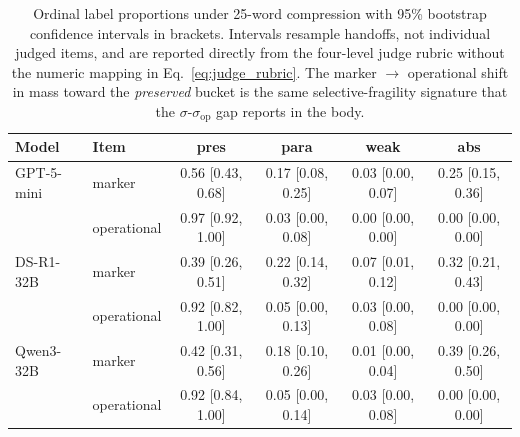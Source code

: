 \begin{table}[t]
\centering
\small
\setlength{\tabcolsep}{3pt}
\begin{tabular}{@{}llcccc@{}}
\toprule
\textbf{Model} & \textbf{Item} & pres & para & weak & abs \\
\midrule
GPT-5-mini & marker & 0.56 [0.43, 0.68] & 0.17 [0.08, 0.25] & 0.03 [0.00, 0.07] & 0.25 [0.15, 0.36] \\
 & operational & 0.97 [0.92, 1.00] & 0.03 [0.00, 0.08] & 0.00 [0.00, 0.00] & 0.00 [0.00, 0.00] \\
\addlinespace
DS-R1-32B & marker & 0.39 [0.26, 0.51] & 0.22 [0.14, 0.32] & 0.07 [0.01, 0.12] & 0.32 [0.21, 0.43] \\
 & operational & 0.92 [0.82, 1.00] & 0.05 [0.00, 0.13] & 0.03 [0.00, 0.08] & 0.00 [0.00, 0.00] \\
\addlinespace
Qwen3-32B & marker & 0.42 [0.31, 0.56] & 0.18 [0.10, 0.26] & 0.01 [0.00, 0.04] & 0.39 [0.26, 0.50] \\
 & operational & 0.92 [0.84, 1.00] & 0.05 [0.00, 0.14] & 0.03 [0.00, 0.08] & 0.00 [0.00, 0.00] \\
\bottomrule
\end{tabular}
\caption{Ordinal label proportions under 25-word compression with 95\% bootstrap confidence intervals in brackets. Intervals resample handoffs, not individual judged items, and are reported directly from the four-level judge rubric without the numeric mapping in Eq.~\ref{eq:judge_rubric}. The marker $\to$ operational shift in mass toward the \emph{preserved} bucket is the same selective-fragility signature that the $\sigma$-$\sigma_\mathrm{op}$ gap reports in the body.\vspace{-12pt}}
\label{tab:ordinal_label_proportions_25word}
\end{table}
